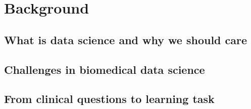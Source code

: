 \chapter{Background} \label{chap:background}

\section{What is data science and why we should care}

\section{Challenges in biomedical data science}

\section{From clinical questions to learning task}
